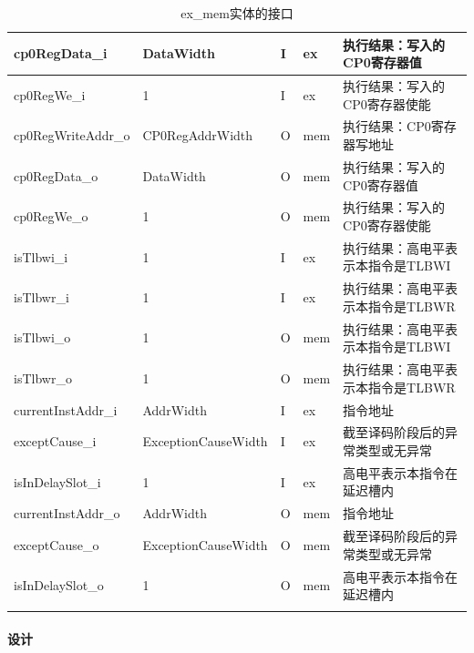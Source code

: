 \documentclass{article}
\begin{document}
\begin{spacing}{1.4}
\begin{longtable}{l|l|l|l|p{5cm}}
\hline cp0RegData\_i           & DataWidth              & I     & ex            & 执行结果：写入的CP0寄存器值 \\
\hline cp0RegWe\_i             & 1                      & I     & ex            & 执行结果：写入的CP0寄存器使能 \\
\hline cp0RegWriteAddr\_o      & CP0RegAddrWidth        & O     & mem           & 执行结果：CP0寄存器写地址 \\
\hline cp0RegData\_o           & DataWidth              & O     & mem           & 执行结果：写入的CP0寄存器值 \\
\hline cp0RegWe\_o             & 1                      & O     & mem           & 执行结果：写入的CP0寄存器使能 \\
\hline isTlbwi\_i              & 1                      & I     & ex            & 执行结果：高电平表示本指令是TLBWI \\
\hline isTlbwr\_i              & 1                      & I     & ex            & 执行结果：高电平表示本指令是TLBWR \\
\hline isTlbwi\_o              & 1                      & O     & mem           & 执行结果：高电平表示本指令是TLBWI \\
\hline isTlbwr\_o              & 1                      & O     & mem           & 执行结果：高电平表示本指令是TLBWR \\
\hline currentInstAddr\_i      & AddrWidth              & I     & ex            & 指令地址 \\
\hline exceptCause\_i          & ExceptionCauseWidth    & I     & ex            & 截至译码阶段后的异常类型或无异常 \\
\hline isInDelaySlot\_i        & 1                      & I     & ex            & 高电平表示本指令在延迟槽内 \\
\hline currentInstAddr\_o      & AddrWidth              & O     & mem           & 指令地址 \\
\hline exceptCause\_o          & ExceptionCauseWidth    & O     & mem           & 截至译码阶段后的异常类型或无异常 \\
\hline isInDelaySlot\_o        & 1                      & O     & mem           & 高电平表示本指令在延迟槽内 \\
\hline
\caption{ex\_mem实体的接口}
\label{tb:exmem-interface}
\end{longtable}

\paragraph{设计}\mbox{}


\end{spacing}
\end{document}
